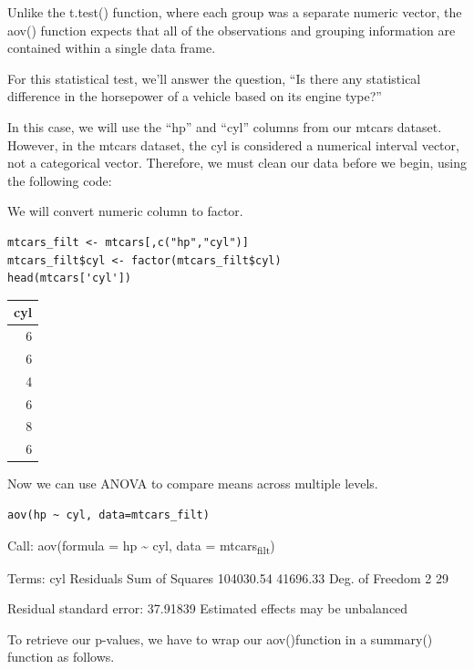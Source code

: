 \documentclass[11pt]{article}
\begin{document}
Unlike the t.test() function, where each group was a separate numeric vector, the aov() function expects that all of the observations and grouping information are contained within a single data frame.

For this statistical test, we'll answer the question, ``Is there any statistical difference in the horsepower of a vehicle based on its engine type?''

In this case, we will use the ``hp'' and ``cyl'' columns from our mtcars dataset. However, in the mtcars dataset, the cyl is considered a numerical interval vector, not a categorical vector. Therefore, we must clean our data before we begin, using the following code:

We will convert numeric column to factor.

\begin{verbatim}
mtcars_filt <- mtcars[,c("hp","cyl")]
mtcars_filt$cyl <- factor(mtcars_filt$cyl)
head(mtcars['cyl'])
\end{verbatim}

\begin{org}
\begin{center}
\begin{tabular}{r}
cyl\\
\hline
6\\
6\\
4\\
6\\
8\\
6\\
\end{tabular}
\end{center}
\end{org}

Now we can use ANOVA to compare means across multiple levels.

\begin{verbatim}
aov(hp ~ cyl, data=mtcars_filt)
\end{verbatim}

\begin{org}
Call:
   aov(formula = hp \textasciitilde{} cyl, data = mtcars\textsubscript{filt})

Terms:
                      cyl Residuals
Sum of Squares  104030.54  41696.33
Deg. of Freedom         2        29

Residual standard error: 37.91839
Estimated effects may be unbalanced
\end{org}

To retrieve our p-values, we have to wrap our aov()function in a summary() function as follows.
\end{document}
